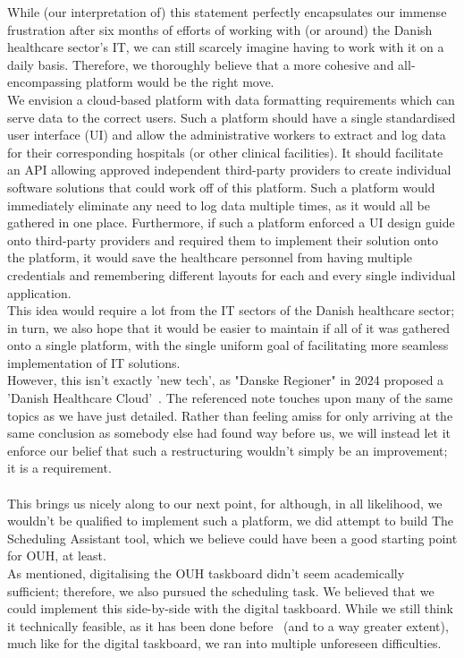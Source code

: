While (our interpretation of) this statement perfectly encapsulates our immense frustration after six months of efforts of working with (or around) the Danish healthcare sector's IT, we can still scarcely imagine having to work with it on a daily basis. Therefore, we thoroughly believe that a more cohesive and all-encompassing platform would be the right move.
\\
We envision a cloud-based platform with data formatting requirements which can serve data to the correct users. Such a platform should have a single standardised user interface (UI) and allow the administrative workers to extract and log data for their corresponding hospitals (or other clinical facilities). It should facilitate an API allowing approved independent third-party providers to create individual software solutions that could work off of this platform. Such a platform would immediately eliminate any need to log data multiple times, as it would all be gathered in one place. Furthermore, if such a platform enforced a UI design guide onto third-party providers and required them to implement their solution onto the platform, it would save the healthcare personnel from having multiple credentials and remembering different layouts for each and every single individual application.
\\
This idea would require a lot from the IT sectors of the Danish healthcare sector; in turn, we also hope that it would be easier to maintain if all of it was gathered onto a single platform, with the single uniform goal of facilitating more seamless implementation of IT solutions.
\\
However, this isn't exactly 'new tech', as "Danske Regioner" in 2024 proposed a 'Danish Healthcare Cloud'~\cite{Den-Reg-digitalisation}. The referenced note touches upon many of the same topics as we have just detailed. Rather than feeling amiss for only arriving at the same conclusion as somebody else had found way before us, we will instead let it enforce our belief that such a restructuring wouldn't simply be an improvement; it is a requirement.
\\
\\
This brings us nicely along to our next point, for although, in all likelihood, we wouldn't be qualified to implement such a platform, we did attempt to build The Scheduling Assistant tool, which we believe could have been a good starting point for OUH, at least.
\\
As mentioned, digitalising the OUH taskboard didn't seem academically sufficient; therefore, we also pursued the scheduling task. We believed that we could implement this side-by-side with the digital taskboard. While we still think it technically feasible, as it has been done before~\cite{you-but-better} (and to a way greater extent), much like for the digital taskboard, we ran into multiple unforeseen difficulties.

